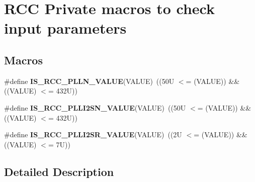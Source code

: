 \hypertarget{group___r_c_c_ex___i_s___r_c_c___definitions}{}\section{R\+CC Private macros to check input parameters}
\label{group___r_c_c_ex___i_s___r_c_c___definitions}
\subsection*{Macros}
\begin{DoxyCompactItemize}
\item 
\mbox{\label{group___r_c_c_ex___i_s___r_c_c___definitions_ga12835741fbedd278ad1e91abebe00837}} 
\#define {\bfseries I\+S\+\_\+\+R\+C\+C\+\_\+\+P\+L\+L\+N\+\_\+\+V\+A\+L\+UE}(V\+A\+L\+UE)~((50\+U $<$= (\+V\+A\+L\+U\+E)) \&\& ((\+V\+A\+L\+U\+E) $<$= 432\+U))
\item 
\mbox{\label{group___r_c_c_ex___i_s___r_c_c___definitions_gac30fb7f6fe9f22a7d6c5585909db5c3c}} 
\#define {\bfseries I\+S\+\_\+\+R\+C\+C\+\_\+\+P\+L\+L\+I2\+S\+N\+\_\+\+V\+A\+L\+UE}(V\+A\+L\+UE)~((50\+U $<$= (\+V\+A\+L\+U\+E)) \&\& ((\+V\+A\+L\+U\+E) $<$= 432\+U))
\item 
\mbox{\label{group___r_c_c_ex___i_s___r_c_c___definitions_gaa2fece4b24f6219b423e1b092b7705c8}} 
\#define {\bfseries I\+S\+\_\+\+R\+C\+C\+\_\+\+P\+L\+L\+I2\+S\+R\+\_\+\+V\+A\+L\+UE}(V\+A\+L\+UE)~((2\+U $<$= (\+V\+A\+L\+U\+E)) \&\& ((\+V\+A\+L\+U\+E) $<$= 7\+U))
\end{DoxyCompactItemize}


\subsection{Detailed Description}
